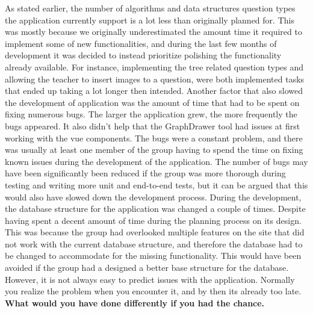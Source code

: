 As stated earlier, the number of algorithms and data structures question types the application currently support is a lot less than originally planned for. This was mostly because we originally underestimated the amount time it required to implement some of new functionalities, and during the last few months of development it was decided to instead prioritize polishing the functionality already available. For instance, implementing the tree related question types and allowing the teacher to insert images to a question, were both implemented tasks that ended up taking a lot longer then intended. Another factor that also slowed the development of application was the amount of time that had to be spent on fixing numerous bugs. The larger the application grew, the more frequently the bugs appeared. It also didn’t help that the GraphDrawer tool had issues at first working with the vue components. The bugs were a constant problem, and there was usually at least one member of the group having to spend the time on fixing known issues during the development of the application. The number of bugs may have been significantly been reduced if the group was more thorough during testing and writing more unit and end-to-end tests, but it can be argued that this would also have slowed down the development process. During the development, the database structure for the application was changed a couple of times. Despite having spent a decent amount of time during the planning process on its design. This was because the group had overlooked multiple features on the site that did not work with the current database structure, and therefore the database had to be changed to accommodate for the missing functionality. This would have been avoided if the group had a designed a better base structure for the database. However, it is not always easy to predict issues with the application. Normally you realize the problem when you encounter it, and by then its already too late.   \\[11pt]
\textbf{What would you have done differently if you had the chance.}